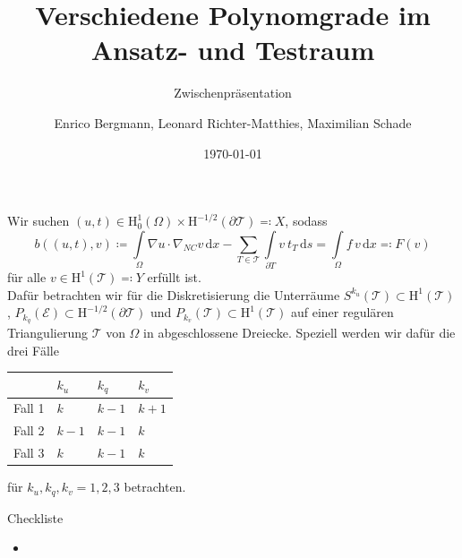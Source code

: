 \documentclass[xcolor=svgnames,ngerman]{beamer}
\author{Enrico Bergmann, Leonard Richter-Matthies, Maximilian Schade}
\title{Verschiedene Polynomgrade im Ansatz- und Testraum}
\subtitle{Zwischenpräsentation}
\institute{Humboldt-Universität zu Berlin}
\date{\today}
\newcommand{\cmark}{\ding{51}}%
\newcommand{\xmark}{\ding{55}}%
\newcommand{\done}{\rlap{$\square$}{\raisebox{2pt}{\large\hspace{1pt}\cmark}}%
\hspace{-2.5pt}}
\newcommand{\wontfix}{\rlap{$\square$}{\large\hspace{1pt}\xmark}}
\providecommand{\integral}[3]{\ensuremath{\int\limits_{#1} \! {#2} \, \mathrm{d}#3}}
\providecommand{\T}{\ensuremath{\mathcal{T}}}
\providecommand{\Hh}{\ensuremath{\mathrm{H}}}
\begin{document}
	\maketitle
	\begin{frame}
Wir suchen $(u,t)\in \Hh_0^1(\Omega) \times \Hh^{-1/2}(\partial \T) \eqqcolon X$, sodass
$$b((u,t),v)\coloneqq\integral{\Omega}{\nabla u\cdot\nabla_{NC}v}{x}-\sum\limits_{T\in\T}\integral{\partial T} {v\ t_T}{s}=\integral{\Omega}{f\, v}{x}\eqqcolon F(v)$$
für alle $v\in \Hh^1(\T)\eqqcolon Y$ erfüllt ist.\\ Dafür betrachten wir für die Diskretisierung die Unterräume $S^{k_u}(\T)\subset \Hh^1(\T)$, $P_{k_q}(\mathcal{E})\subset \Hh^{-1/2}(\partial\T)$ und $P_{k_v}(\T)\subset \Hh^1(\T)$ auf einer regulären Triangulierung $\T$ von $\Omega$ in abgeschlossene Dreiecke. Speziell werden wir dafür die drei Fälle
\begin{center}
\begin{tabular}{l | l l l}
	& $k_u$ & $k_q$ & $k_v$\\\hline
	Fall 1 & $k$ & $k-1$ & $k+1$ \\
	Fall 2 & $k-1$ & $k-1$ & $k$ \\
	Fall 3 & $k$ & $k-1$ & $k$ 
\end{tabular}
\end{center}
für $k_u,k_q,k_v=1,2,3$ betrachten. 


\end{frame}

\begin{frame}{Checkliste}
\begin{itemize}
  \item
\end{itemize}
\end{frame}	
	
\end{document}
